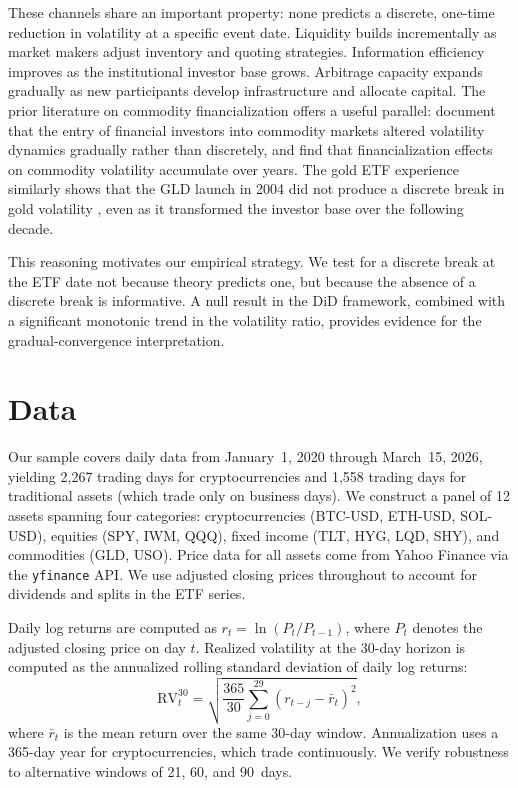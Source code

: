 \documentclass[12pt,a4paper]{article}
\begin{document}
These channels share an important property: none predicts a discrete,
one-time reduction in volatility at a specific event date. Liquidity builds
incrementally as market makers adjust inventory and quoting strategies.
Information efficiency improves as the institutional investor base grows.
Arbitrage capacity expands gradually as new participants develop
infrastructure and allocate capital. The prior literature on commodity
financialization offers a useful parallel: \citet{cheng2014financialization}
document that the entry of financial investors into commodity markets
altered volatility dynamics gradually rather than discretely, and
\citet{ding2021commodity} find that financialization effects on commodity
volatility accumulate over years. The gold ETF experience similarly shows
that the GLD launch in 2004 did not produce a discrete break in gold
volatility \citep{baur2010gold}, even as it transformed the investor base
over the following decade.

This reasoning motivates our empirical strategy. We test for a discrete
break at the ETF date not because theory predicts one, but because the
absence of a discrete break is informative. A null result in the DiD
framework, combined with a significant monotonic trend in the volatility
ratio, provides evidence for the gradual-convergence interpretation.

\FloatBarrier

\section{Data}\label{sec:data}

Our sample covers daily data from January~1, 2020 through March~15, 2026,
yielding 2,267 trading days for cryptocurrencies and 1,558 trading days for
traditional assets (which trade only on business days). We construct a panel
of 12 assets spanning four categories: cryptocurrencies (BTC-USD, ETH-USD,
SOL-USD), equities (SPY, IWM, QQQ), fixed income (TLT, HYG, LQD, SHY),
and commodities (GLD, USO). Price data for all assets come from Yahoo
Finance via the \texttt{yfinance} API. We use adjusted closing prices
throughout to account for dividends and splits in the ETF series.

Daily log returns are computed as $r_t = \ln(P_t / P_{t-1})$, where $P_t$
denotes the adjusted closing price on day $t$. Realized volatility at the
30-day horizon is computed as the annualized rolling standard deviation of
daily log returns:
\begin{equation}\label{eq:rv}
  \text{RV}^{30}_t = \sqrt{\frac{365}{30} \sum_{j=0}^{29} (r_{t-j} - \bar{r}_{t})^2},
\end{equation}
where $\bar{r}_t$ is the mean return over the same 30-day window.
Annualization uses a 365-day year for cryptocurrencies, which trade
continuously. We verify robustness to alternative windows of 21, 60, and
90~days.
\end{document}

